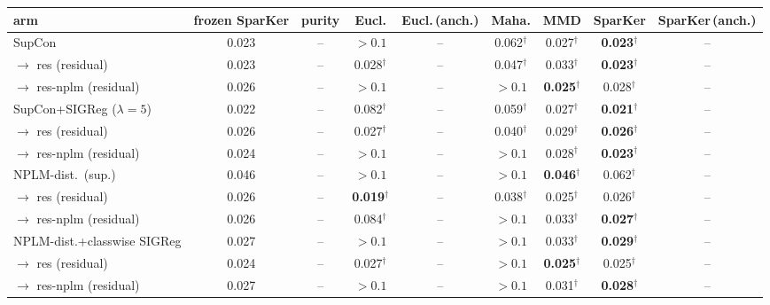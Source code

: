 \begin{table}[t]
\centering
\footnotesize
\begin{tabular}{lcccccccc}
\toprule
arm & frozen SparKer & purity & Eucl. & Eucl.\,(anch.) & Maha. & MMD & SparKer & SparKer\,(anch.) \\
\midrule
SupCon & 0.023 & -- & $>0.1$ & -- & 0.062$^\dagger$ & 0.027$^\dagger$ & \textbf{0.023$^\dagger$} & -- \\
\quad $\to$ res (residual) & 0.023 & -- & 0.028$^\dagger$ & -- & 0.047$^\dagger$ & 0.033$^\dagger$ & \textbf{0.023$^\dagger$} & -- \\
\quad $\to$ res-nplm (residual) & 0.026 & -- & $>0.1$ & -- & $>0.1$ & \textbf{0.025$^\dagger$} & 0.028$^\dagger$ & -- \\
\addlinespace
SupCon+SIGReg ($\lambda{=}5$) & 0.022 & -- & 0.082$^\dagger$ & -- & 0.059$^\dagger$ & 0.027$^\dagger$ & \textbf{0.021$^\dagger$} & -- \\
\quad $\to$ res (residual) & 0.026 & -- & 0.027$^\dagger$ & -- & 0.040$^\dagger$ & 0.029$^\dagger$ & \textbf{0.026$^\dagger$} & -- \\
\quad $\to$ res-nplm (residual) & 0.024 & -- & $>0.1$ & -- & $>0.1$ & 0.028$^\dagger$ & \textbf{0.023$^\dagger$} & -- \\
\addlinespace
NPLM-dist.\ (sup.) & 0.046 & -- & $>0.1$ & -- & $>0.1$ & \textbf{0.046$^\dagger$} & 0.062$^\dagger$ & -- \\
\quad $\to$ res (residual) & 0.026 & -- & \textbf{0.019$^\dagger$} & -- & 0.038$^\dagger$ & 0.025$^\dagger$ & 0.026$^\dagger$ & -- \\
\quad $\to$ res-nplm (residual) & 0.026 & -- & 0.084$^\dagger$ & -- & $>0.1$ & 0.033$^\dagger$ & \textbf{0.027$^\dagger$} & -- \\
\addlinespace
NPLM-dist.+classwise SIGReg & 0.027 & -- & $>0.1$ & -- & $>0.1$ & 0.033$^\dagger$ & \textbf{0.029$^\dagger$} & -- \\
\quad $\to$ res (residual) & 0.024 & -- & 0.027$^\dagger$ & -- & $>0.1$ & \textbf{0.025$^\dagger$} & 0.025$^\dagger$ & -- \\
\quad $\to$ res-nplm (residual) & 0.027 & -- & $>0.1$ & -- & $>0.1$ & 0.031$^\dagger$ & \textbf{0.028$^\dagger$} & -- \\

\end{tabular}
\end{table}
